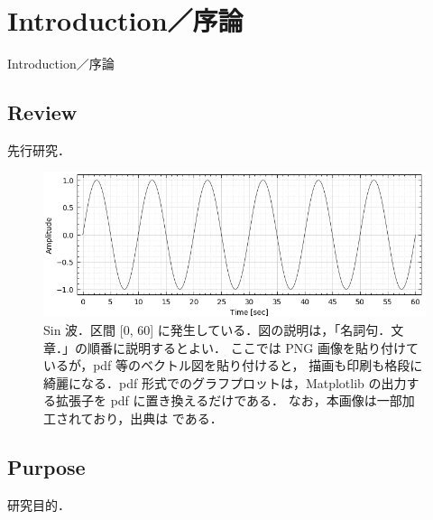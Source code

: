 \chapter{Introduction／序論}
\label{chap_Introduction}

Introduction／序論

\section{Review}
先行研究．

\begin{figure} %
  \centering
  \includegraphics[width=15cm]{./figs/sin.png}
  \caption{
    Sin 波．区間 [0, 60] に発生している．図の説明は，「名詞句．文章．」の順番に説明するとよい．
    ここでは PNG 画像を貼り付けているが，pdf 等のベクトル図を貼り付けると，
    描画も印刷も格段に綺麗になる．pdf 形式でのグラフプロットは，Matplotlib の出力する拡張子を pdf に置き換えるだけである．
    なお，本画像は一部加工されており，出典は \citep{ADMIS2018} である．
  }
  \label{fig_ADMIS2018}
\end{figure}

\section{Purpose}
研究目的．

